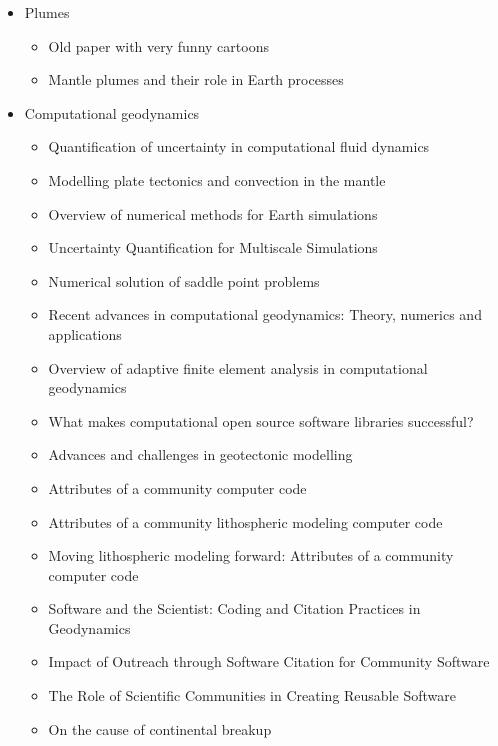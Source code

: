 \begin{itemize}
\item Plumes
   \begin{itemize}
   \item[\nineteenseventyseven] Old paper with very funny cartoons \cite{hovo77}
   \item[\twothousandtwentyone] Mantle plumes and their role in Earth processes \cite{kobj21}
   \end{itemize}


\item Computational geodynamics
   \begin{itemize}
   \item [\nineteenninetyseven] Quantification of uncertainty in computational fluid dynamics \cite{roac97}
   \item [\twothousand] Modelling plate tectonics and convection in the mantle \cite{mogz00}
   \item [\twothousandone] Overview of numerical methods for Earth simulations \cite{momd01}
   \item [\twothousandtwo] Uncertainty Quantification for Multiscale Simulations \cite{degg02}
   \item [\twothousandfive] Numerical solution of saddle point problems \cite{begl05}
   \item [\twothousandeight] Recent advances in computational geodynamics: Theory, numerics and applications \cite{kags08}
   \item [\twothousandthirteen] Overview of adaptive finite element analysis in computational geodynamics \cite{masm13}
   \item [\twothousandthirteen] What makes computational open source software libraries successful? \cite{bahe13}
   \item [\twothousandfourteen] Advances and challenges in geotectonic modelling \cite{bufy14}
   \item [\twothousandfifteen] Attributes of a community computer code \cite{comc15}
   \item [\twothousandfifteen] Attributes of a community lithospheric modeling computer code \cite{comc15}
   \item [\twothousandfifteen] Moving lithospheric modeling forward: Attributes of a community computer code \cite{comc15}
   \item [\twothousandseventeen] Software and the Scientist: Coding and Citation Practices in Geodynamics \cite{hwfs17}
   \item [\twothousandnineteen] Impact of Outreach through Software Citation for Community Software \cite{hwpc19}
   \item [\twothousandnineteen] The Role of Scientific Communities in Creating Reusable Software \cite{kehg19}
   \item [\twothousandtwenty] On the cause of continental breakup \cite{niu20}
   \end{itemize}


\end{itemize}
